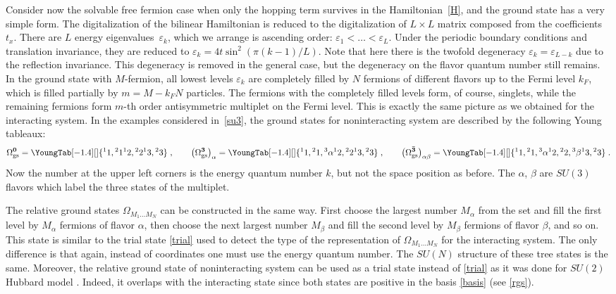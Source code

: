 \documentclass[pdftex]{sigma}
\begin{document}
Consider now the solvable free fermion case  when only the hopping
term survives in the Hamiltonian~\eqref{H}, and the ground state has a
very simple form.
The digitalization of the bilinear Hamiltonian is reduced to the digitalization
of $L\times L$ matrix composed from the coef\/f\/icients~$t_x$. There are $L$ energy
eigenvalues~$\varepsilon_k$, which we arrange is ascending order: $\varepsilon_1<\dots<\varepsilon_L$.
Under the periodic boundary conditions and translation invariance,
they are reduced to  $\varepsilon_k=4t\sin^2(\pi (k-1)/L)$. Note that here there is the twofold degeneracy
$\varepsilon_k=\varepsilon_{L-k}$ due to the ref\/lection invariance.
This degeneracy is removed in the general case, but the degeneracy on the f\/lavor quantum number
still remains.  In the ground state with $M$-fermion, all lowest levels $\varepsilon_k$ are completely f\/illed
by $N$ fermions of dif\/ferent f\/lavors up to the Fermi level $k_F$, which is f\/illed
partially by $m=M-k_F N$ particles. The fermions with the completely f\/illed levels form, of course,
singlets, while  the remaining fermions form $m$-th order antisymmetric multiplet on the Fermi level.
This is exactly the same picture as we obtained for the interacting system.
In the examples considered in~\eqref{su3}, the
ground states for noninteracting system are described by the following Young tableaux:
\[
\Omega_\text{gs}^\mathbf{0}=\YoungTab[-1.4][\normalsize]{ {{}^1 1,{}^2 1} {{}^1 2,{}^2 2 }   {{}^1 3, {}^2 3 }}
\;,\qquad
\left(\Omega^\mathbf{3}_\text{gs}\right)_\alpha
=\YoungTab[-1.4][\normalsize]{ {{}^1 1,{}^2 1,{}^3 \alpha} {{}^1 2,{}^2 2 } {{}^1 3, {}^2 3 }}
\;,\qquad
\big(\Omega^\mathbf{\bar{3}}_\text{gs} \big)_{\alpha\beta}
=\YoungTab[-1.4][\normalsize]{ {{}^1 1,{}^2 1,{}^3 \alpha} {{}^1 2,{}^2 2, {}^3 \beta } {{}^1 3, {}^2 3 }}
\;.
\]
Now the number at the upper left corners is the energy quantum number $k$, but not the
space position as before. The $\alpha$, $\beta$ are $SU(3)$ f\/lavors which label the three states
of the multiplet.

The relative ground states
$\Omega_{M_1\dots M_N}$ can be constructed
in the same way. First choose the largest number $M_\alpha$ from the set and f\/ill the f\/irst
level by $M_\alpha$ fermions of f\/lavor $\alpha$, then choose the next largest number
$M_\beta$   and f\/ill the second
level by $M_\beta$ fermions of f\/lavor $\beta$, and so on. This state is similar to the
trial state \eqref{trial} used to detect the type of the representation of  $\Omega_{M_1\dots M_N}$
for the interacting system. The only dif\/ference is that again, instead of coordinates
one must use the energy quantum number. The $SU(N)$ structure of these tree states
is the same.  Moreover, the relative ground state of noninteracting system can be used
as a trial state instead of \eqref{trial} as it was done for $SU(2)$ Hubbard model \cite{LM62',Amb92-2}.
Indeed, it overlaps with the interacting state  since
both states are positive in the basis \eqref{basis} (see \eqref{rgs}).
\end{document}
